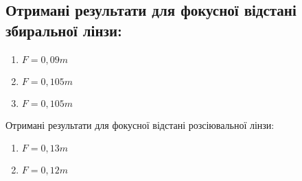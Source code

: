 \subsection{Отримані результати для фокусної відстані збиральної лінзи:}

\begin{enumerate}
  \item $F=0,09 m$
  \item $F=0,105m$
  \item $F=0,105m$
\end{enumerate}
Отримані результати для фокусної відстані розсіювальної лінзи:
\begin{enumerate}
  \item $F=0,13 m$
  \item $F=0,12m$
\end{enumerate}

